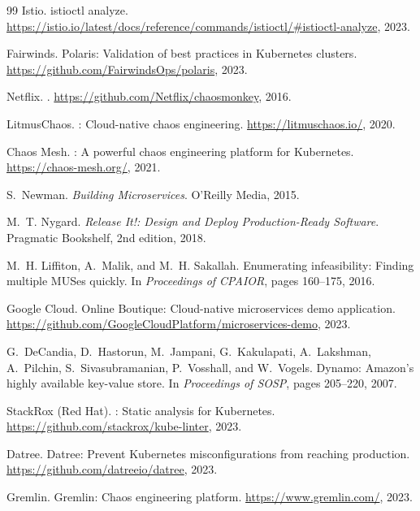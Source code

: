 \documentclass[10pt,twocolumn]{article}
\begin{document}
\begin{thebibliography}{99}
Istio.
\newblock istioctl analyze.
\newblock \url{https://istio.io/latest/docs/reference/commands/istioctl/#istioctl-analyze}, 2023.

Fairwinds.
\newblock Polaris: Validation of best practices in Kubernetes clusters.
\newblock \url{https://github.com/FairwindsOps/polaris}, 2023.

Netflix.
.
\newblock \url{https://github.com/Netflix/chaosmonkey}, 2016.

LitmusChaos.
: Cloud-native chaos engineering.
\newblock \url{https://litmuschaos.io/}, 2020.

Chaos Mesh.
: A powerful chaos engineering platform for Kubernetes.
\newblock \url{https://chaos-mesh.org/}, 2021.

S.~Newman.
\newblock \emph{Building Microservices}.
\newblock O'Reilly Media, 2015.

M.~T. Nygard.
\newblock \emph{Release It!: Design and Deploy Production-Ready Software}.
\newblock Pragmatic Bookshelf, 2nd edition, 2018.

M.~H. Liffiton, A.~Malik, and M.~H. Sakallah.
\newblock Enumerating infeasibility: Finding multiple {MUSes} quickly.
\newblock In \emph{Proceedings of CPAIOR}, pages 160--175, 2016.

Google Cloud.
\newblock Online Boutique: Cloud-native microservices demo application.
\newblock \url{https://github.com/GoogleCloudPlatform/microservices-demo}, 2023.

G.~DeCandia, D.~Hastorun, M.~Jampani, G.~Kakulapati, A.~Lakshman,
  A.~Pilchin, S.~Sivasubramanian, P.~Vosshall, and W.~Vogels.
\newblock Dynamo: {Amazon's} highly available key-value store.
\newblock In \emph{Proceedings of SOSP}, pages 205--220, 2007.

StackRox (Red Hat).
: Static analysis for {Kubernetes}.
\newblock \url{https://github.com/stackrox/kube-linter}, 2023.

Datree.
\newblock Datree: Prevent {Kubernetes} misconfigurations from reaching production.
\newblock \url{https://github.com/datreeio/datree}, 2023.

Gremlin.
\newblock Gremlin: Chaos engineering platform.
\newblock \url{https://www.gremlin.com/}, 2023.


\end{thebibliography}
\end{document}
